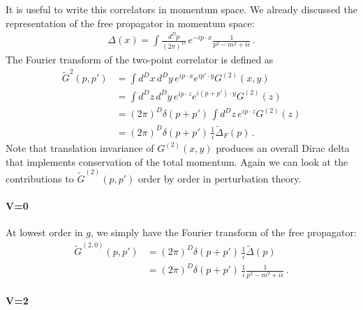 It is useful to write this correlators in momentum space. We already
discussed the representation of the free propagator in momentum space: 
\begin{align}
  \Delta(x) = \int \frac{d^Dp}{(2\pi)^D}\, e^{-ip\cdot x}
  \frac{1}{p^2 - m^2 + i\epsilon}\, .
\end{align}
The Fourier transform of the two-point correlator is defined as
\begin{align}
  \tilde{G}^{2}\left(p,p'\right) 
  &= 
    \int d^Dx\, d^Dy\, e^{ip\cdot x} e^{ip'\cdot y} 
    G^{(2)}(x,y) \\
  &= \int d^Dz\, d^Dy\, e^{ip\cdot z} e^{i(p+p')\cdot y} G^{(2)}(z) \\
  &= \left(2\pi\right)^D \delta(p+p')\, \int d^Dz\, e^{ip\cdot z}
    G^{(2)}(z)  \\
  &= \left(2\pi\right)^D \delta(p+p')\, \frac{1}{i} \tilde{\Delta}_F(p)\, .
\end{align}
Note that translation invariance of $G^{(2)}(x,y)$ produces an overall
Dirac delta that implements conservation of the total momentum. Again
we can look at the contributions to $\tilde{G}^{(2)}(p,p')$ order by
order in perturbation theory. 

\paragraph{V=0}

At lowest order in $g$, we simply have the Fourier transform of the
free propagator:
\begin{align}
  \tilde{G}^{(2,0)}(p,p') 
  &= 
    \left(2\pi\right)^D \delta(p+p')\,
    \frac{1}{i} \tilde{\Delta}(p) \\
  &=
    \left(2\pi\right)^D \delta(p+p')\,
    \frac{1}{i} \frac{1}{p^2-m^2+i\epsilon}\, .
\end{align}

\paragraph{V=2}


